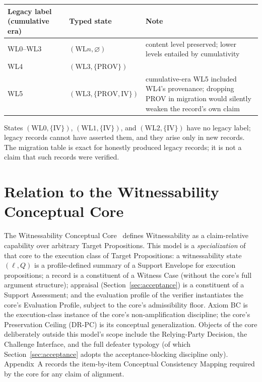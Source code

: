 \documentclass[11pt]{article}
\begin{document}
\begin{center}
\small
\begin{tabularx}{\textwidth}{@{}llY@{}}
\toprule
Legacy label (cumulative era) & Typed state & Note \\
\midrule
WL0--WL3 & $(\mathrm{WL}n, \varnothing)$ & content level preserved; lower levels entailed by cumulativity \\
WL4 & $(\mathrm{WL3}, \{\mathrm{PROV}\})$ & \\
WL5 & $(\mathrm{WL3}, \{\mathrm{PROV}, \mathrm{IV}\})$ & cumulative-era WL5 included WL4's provenance; dropping PROV in migration would silently weaken the record's own claim \\
\bottomrule
\end{tabularx}
\end{center}

States $(\mathrm{WL0},\{\mathrm{IV}\})$, $(\mathrm{WL1},\{\mathrm{IV}\})$, and $(\mathrm{WL2},\{\mathrm{IV}\})$ have no legacy label; legacy records cannot have asserted them, and they arise only in new records. The migration table is exact for honestly produced legacy records; it is not a claim that such records were verified.

\section{Relation to the Witnessability Conceptual Core}
\label{sec:wcc-relation}

The Witnessability Conceptual Core~\cite{wcc_core_2026} defines Witnessability as a claim-relative capability over arbitrary Target Propositions. This model is a \emph{specialization} of that core to the execution class of Target Propositions: a witnessability state $(\ell, Q)$ is a profile-defined summary of a Support Envelope for execution propositions; a record is a constituent of a Witness Case (without the core's full argument structure); appraisal (Section~\ref{sec:acceptance}) is a constituent of a Support Assessment; and the evaluation profile of the verifier instantiates the core's Evaluation Profile, subject to the core's admissibility floor. Axiom BC is the execution-class instance of the core's non-amplification discipline; the core's Preservation Ceiling (DR-PC) is its conceptual generalization. Objects of the core deliberately outside this model's scope include the Relying-Party Decision, the Challenge Interface, and the full defeater typology (of which Section~\ref{sec:acceptance} adopts the acceptance-blocking discipline only). Appendix~A records the item-by-item Conceptual Consistency Mapping required by the core for any claim of alignment.
\end{document}
